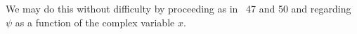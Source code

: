 We may do this without difficulty by proceeding as in \SS~47 and 50 and
regarding $\psi$ as a function of the complex variable $x$.
